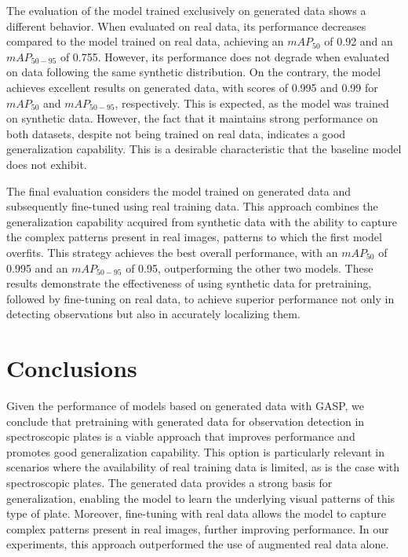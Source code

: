 \documentclass[runningheads]{llncs}
\begin{document}
The evaluation of the model trained exclusively on generated data shows a different behavior. When evaluated on real data, its performance decreases compared to the model trained on real data, achieving an $mAP_{50}$ of 0.92 and an $mAP_{50-95}$ of 0.755. However, its performance does not degrade when evaluated on data following the same synthetic distribution. On the contrary, the model achieves excellent results on generated data, with scores of 0.995 and 0.99 for $mAP_{50}$ and $mAP_{50-95}$, respectively.
This is expected, as the model was trained on synthetic data. However, the fact that it maintains strong performance on both datasets, despite not being trained on real data, indicates a good generalization capability. This is a desirable characteristic that the baseline model does not exhibit.

The final evaluation considers the model trained on generated data and subsequently fine-tuned using real training data. This approach combines the generalization capability acquired from synthetic data with the ability to capture the complex patterns present in real images, patterns to which the first model overfits.
This strategy achieves the best overall performance, with an $mAP_{50}$ of 0.995 and an $mAP_{50-95}$ of 0.95, outperforming the other two models. These results demonstrate the effectiveness of using synthetic data for pretraining, followed by fine-tuning on real data, to achieve superior performance not only in detecting observations but also in accurately localizing them.

\section{Conclusions}

Given the performance of models based on generated data with GASP, we conclude that pretraining with generated data for observation detection in spectroscopic plates is a viable approach that improves performance and promotes good generalization capability. This option is particularly relevant in scenarios where the availability of real training data is limited, as is the case with spectroscopic plates. The generated data provides a strong basis for generalization, enabling the model to learn the underlying visual patterns of this type of plate. Moreover, fine-tuning with real data allows the model to capture complex patterns present in real images, further improving performance. In our experiments, this approach outperformed the use of augmented real data alone.
\end{document}
